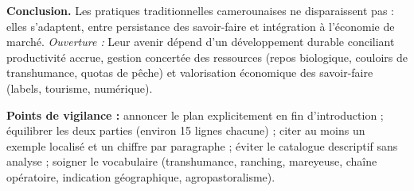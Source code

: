 \documentclass[11pt]{article}
\begin{document}
\begin{corrige}
\textbf{Conclusion.} Les pratiques traditionnelles camerounaises ne disparaissent pas : elles s'adaptent, entre persistance des savoir-faire et intégration à l'économie de marché. \emph{Ouverture :} Leur avenir dépend d'un développement durable conciliant productivité accrue, gestion concertée des ressources (repos biologique, couloirs de transhumance, quotas de pêche) et valorisation économique des savoir-faire (labels, tourisme, numérique).

\textbf{Points de vigilance :} annoncer le plan explicitement en fin d'introduction ; équilibrer les deux parties (environ 15 lignes chacune) ; citer au moins un exemple localisé et un chiffre par paragraphe ; éviter le catalogue descriptif sans analyse ; soigner le vocabulaire (transhumance, ranching, mareyeuse, chaîne opératoire, indication géographique, agropastoralisme).
\end{corrige}
\end{document}
